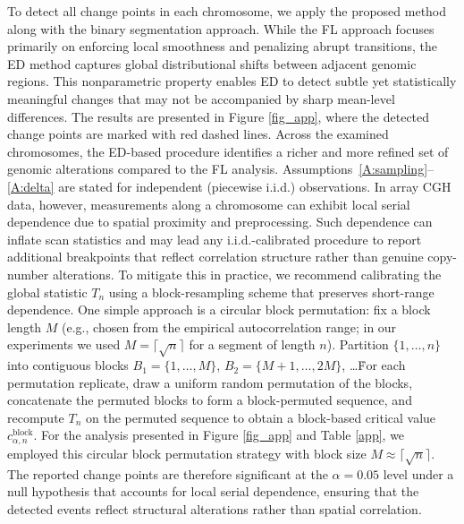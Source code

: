 \documentclass[11pt]{article}
\numberwithin{theorem}{section}
\numberwithin{Lemma}{section}
\numberwithin{Definition}{section}
\begin{document}
To detect all change points in each chromosome, we apply the proposed method along with the binary segmentation approach. While the FL approach focuses primarily on enforcing local smoothness and penalizing abrupt transitions, the ED method captures global distributional shifts between adjacent genomic regions. This nonparametric property enables ED to detect subtle yet statistically meaningful changes that may not be accompanied by sharp mean-level differences. The results are presented in Figure \ref{fig_app}, where the detected change points are marked with red dashed lines. Across the examined chromosomes, the ED-based procedure identifies a richer and more refined set of genomic alterations compared to the FL analysis. Assumptions~\ref{A:sampling}–\ref{A:delta} are stated for independent (piecewise i.i.d.) observations. In array CGH data, however, measurements along a chromosome can exhibit local serial dependence due to spatial proximity and preprocessing. Such dependence can inflate scan statistics and may lead any i.i.d.-calibrated procedure to report additional breakpoints that reflect correlation structure rather than genuine copy-number alterations. To mitigate this in practice, we recommend calibrating the global statistic $T_n$ using a block-resampling scheme that preserves short-range dependence. One simple approach is a circular block permutation: fix a block length $M$ (e.g., chosen from the empirical autocorrelation range;
in our experiments we used $M=\lceil \sqrt{n}\rceil$ for a segment of length $n$).
Partition $\{1,\dots,n\}$ into contiguous blocks
$B_1=\{1,\dots,M\}$, $B_2=\{M+1,\dots,2M\}$, \dots\.
For each permutation replicate, draw a uniform random permutation of the blocks,
concatenate the permuted blocks to form a block-permuted sequence, and recompute
$T_n$  on the permuted sequence to obtain a block-based critical
value $c^{\mathrm{block}}_{\alpha,n}$. For the analysis presented in Figure \ref{fig_app} and Table \ref{app}, we employed this circular block permutation strategy with block size $M \approx \lceil \sqrt{n}\rceil$. The reported change points are therefore significant at the $\alpha=0.05$ level under a null hypothesis that accounts for local serial dependence, ensuring that the detected events reflect structural alterations rather than spatial correlation. \\
\end{document}
